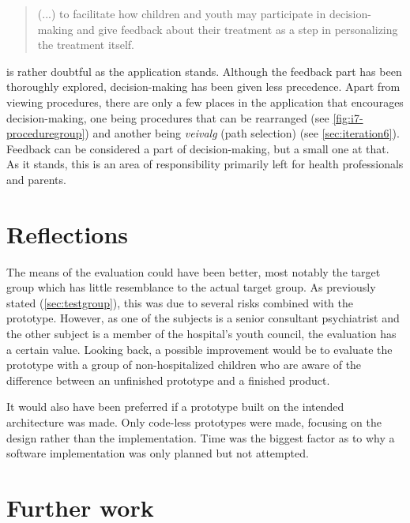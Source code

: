 \begin{quote}
    (...) to facilitate how children and youth may participate in decision-making and give feedback about their treatment as a step in personalizing the treatment itself.
\end{quote}

is rather doubtful as the application stands. Although the feedback part has been thoroughly explored, decision-making has been given less precedence. Apart from viewing procedures, there are only a few places in the application that encourages decision-making, one being procedures that can be rearranged (see \autoref{fig:i7-proceduregroup}) and another being \emph{veivalg} (path selection) (see \autoref{sec:iteration6}). Feedback can be considered a part of decision-making, but a small one at that. As it stands, this is an area of responsibility primarily left for health professionals and parents.


\section{Reflections}
\label{sec:reflections}

The means of the evaluation could have been better, most notably the target group which has little resemblance to the actual target group. As previously stated (\autoref{sec:testgroup}), this was due to several risks combined with the prototype. However, as one of the subjects is a senior consultant psychiatrist and the other subject is a member of the hospital's youth council, the evaluation has a certain value. Looking back, a possible improvement would be to evaluate the prototype with a group of non-hospitalized children who are aware of the difference between an unfinished prototype and a finished product.

It would also have been preferred if a prototype built on the intended architecture was made. Only code-less prototypes were made, focusing on the design rather than the implementation. Time was the biggest factor as to why a software implementation was only planned but not attempted.

\section{Further work}
\label{sec:furtherwork}

